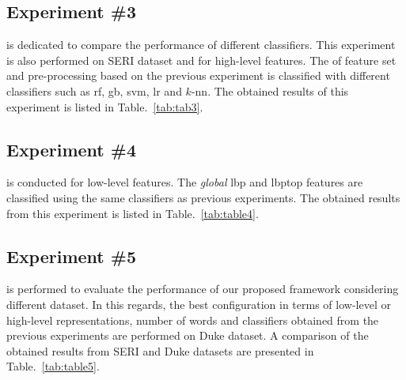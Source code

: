 \subsection{Experiment \#3}
 is dedicated to compare the performance of different classifiers.
This experiment is also performed on SERI dataset and for high-level features.
The  of feature set and pre-processing based on the previous experiment is classified with different classifiers such as \ac{rf}, \ac{gb}, \ac{svm}, \ac{lr} and $k$-\ac{nn}.
The obtained results of this experiment is listed in Table.~\ref{tab:tab3}.\\


\subsection{Experiment \#4}
 is conducted for low-level features.
The \emph{global} \ac{lbp} and \ac{lbptop} features are classified using the same classifiers as previous experiments.
The obtained results from this experiment is listed in Table.~\ref{tab:table4}.\\


\subsection{Experiment \#5}
 is performed to evaluate the performance of our proposed framework considering different dataset.
In this regards, the best configuration in terms of low-level or high-level representations, number of words and classifiers obtained from the previous experiments are performed on Duke dataset.
A comparison of the obtained results from SERI and Duke datasets are presented in Table.~\ref{tab:table5}.
  


